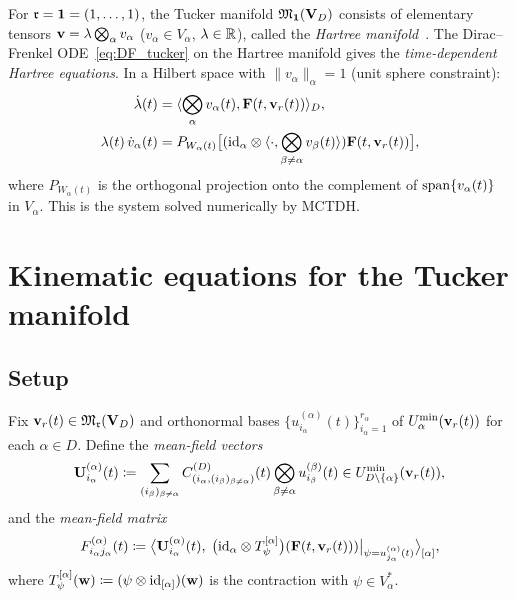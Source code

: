\begin{example}
\label{ex:hartree}
For $\mathfrak{r} = \mathbf{1} = (1, \ldots, 1)$, the Tucker manifold
$\mathfrak{M}_{\mathbf{1}}(\mathbf{V}_D)$ consists of elementary tensors
$\mathbf{v} = \lambda \bigotimes_\alpha v_\alpha$ ($v_\alpha \in V_\alpha$,
$\lambda \in \mathbb{R}$), called the \emph{Hartree manifold}~\cite{Lubich2008}.
The Dirac--Frenkel ODE~\eqref{eq:DF_tucker} on the Hartree manifold
gives the \emph{time-dependent Hartree equations}. In a Hilbert space
with $\|v_\alpha\|_\alpha = 1$ (unit sphere constraint):
\begin{align*}
    \dot{\lambda}(t) &= \langle \bigotimes_\alpha v_\alpha(t),
        \mathbf{F}(t, \mathbf{v}_r(t)) \rangle_D, \\
    \lambda(t)\,\dot{v}_\alpha(t) &= P_{W_\alpha(t)}\bigl[
        (\mathrm{id}_{\alpha} \otimes \langle \cdot, \bigotimes_{\beta \neq \alpha}
        v_\beta(t) \rangle)\mathbf{F}(t, \mathbf{v}_r(t))\bigr],
\end{align*}
where $P_{W_\alpha(t)}$ is the orthogonal projection onto the
complement of $\mathrm{span}\{v_\alpha(t)\}$ in $V_\alpha$. This is
the system solved numerically by MCTDH.
\end{example}

\section{Kinematic equations for the Tucker manifold}
\label{sec:DF:kinematic}

\subsection*{Setup}

Fix $\mathbf{v}_r(t) \in \mathfrak{M}_{\mathfrak{r}}(\mathbf{V}_D)$ and orthonormal bases
$\{u^{(\alpha)}_{i_\alpha}(t)\}_{i_\alpha=1}^{r_\alpha}$ of
$U^{\min}_{\alpha}(\mathbf{v}_r(t))$ for each $\alpha \in D$. Define the
\emph{mean-field vectors}
\begin{equation}
\label{eq:DF:Ualpha2}
    \mathbf{U}^{(\alpha)}_{i_\alpha}(t)
    \coloneqq \sum_{(i_\beta)_{\beta \neq \alpha}}
    C^{(D)}_{(i_\alpha,(i_\beta)_{\beta\neq\alpha})}(t)
    \bigotimes_{\beta \neq \alpha} u^{(\beta)}_{i_\beta}(t)
    \in U^{\min}_{D\setminus\{\alpha\}}(\mathbf{v}_r(t)),
\end{equation}
and the \emph{mean-field matrix}
\begin{equation}
\label{eq:DF:meanfield}
    F^{(\alpha)}_{i_\alpha j_\alpha}(t)
    \coloneqq
    \bigl\langle
    \mathbf{U}^{(\alpha)}_{i_\alpha}(t),\;
    \bigl(\mathrm{id}_{\alpha} \otimes
    T_\psi^{[\alpha]}\bigr)(\mathbf{F}(t,\mathbf{v}_r(t)))
    \big|_{\psi=u^{(\alpha)}_{j_\alpha}(t)}
    \bigr\rangle_{[\alpha]},
\end{equation}
where $T_\psi^{[\alpha]}(\mathbf{w}) \coloneqq (\psi \otimes \mathrm{id}_{[\alpha]})(\mathbf{w})$
is the contraction with $\psi \in V_\alpha^*$.

